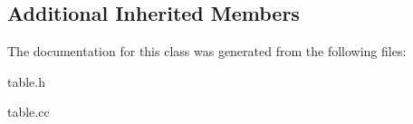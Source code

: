 \subsection*{Additional Inherited Members}


The documentation for this class was generated from the following files\+:\begin{DoxyCompactItemize}
\item 
table.\+h\item 
table.\+cc\end{DoxyCompactItemize}
